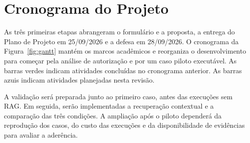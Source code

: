 \chapter{Cronograma do Projeto}
\label{cap:cronograma}

As três primeiras etapas abrangeram o formulário e a proposta, a entrega do Plano de Projeto em 25/09/2026 e a defesa em 28/09/2026. O cronograma da Figura~\ref{fig:gantt} mantém os marcos acadêmicos e reorganiza o desenvolvimento para começar pela análise de autorização e por um caso piloto executável. As barras verdes indicam atividades concluídas no cronograma anterior. As barras azuis indicam atividades planejadas nesta revisão.

A validação será preparada junto ao primeiro caso, antes das execuções sem RAG. Em seguida, serão implementadas a recuperação contextual e a comparação das três condições. A ampliação após o piloto dependerá da reprodução dos casos, do custo das execuções e da disponibilidade de evidências para avaliar a aderência.

